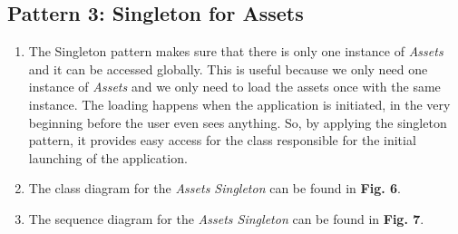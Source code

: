 \documentclass[a4paper,11pt]{article}
\begin{document}
\subsection{Pattern 3: Singleton for Assets}
\begin{enumerate}
\item The Singleton pattern makes sure that there is only one instance of \textit{Assets} and it can be accessed globally. This is useful because we only need one instance of \textit{Assets} and we only need to load the assets once with the same instance. The loading happens when the application is initiated, in the very beginning before the user even sees anything. So, by applying the singleton pattern, it provides easy access for the class responsible for the initial launching of the application.

\newpage
\item The class diagram for the \textit{Assets Singleton} can be found in \textbf{Fig. 6}.
\begin{minipage}{\linewidth}
\end{minipage}

\item The sequence diagram for the \textit{Assets Singleton} can be found in \textbf{Fig. 7}.
\begin{minipage}{\linewidth}
\end{minipage}
\end{enumerate}
\end{document}
